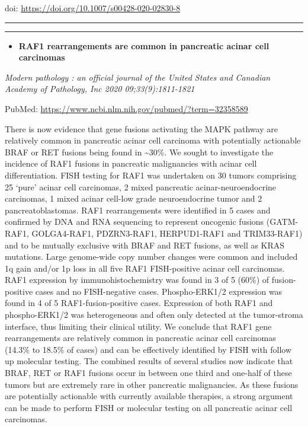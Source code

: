 \documentclass[
]{article}
\providecommand{\tightlist}{%
  \setlength{\itemsep}{0pt}\setlength{\parskip}{0pt}}
\begin{document}
doi: \url{https://doi.org/10.1007/s00428-020-02830-8}

\begin{center}\rule{0.5\linewidth}{0.5pt}\end{center}

\begin{center}\rule{0.5\linewidth}{0.5pt}\end{center}

\begin{itemize}
\tightlist
\item
  \textbf{RAF1 rearrangements are common in pancreatic acinar cell
  carcinomas}
\end{itemize}

\emph{Modern pathology : an official journal of the United States and
Canadian Academy of Pathology, Inc 2020 09;33(9):1811-1821}

PubMed: \url{https://www.ncbi.nlm.nih.gov/pubmed/?term=32358589}

There is now evidence that gene fusions activating the MAPK pathway are
relatively common in pancreatic acinar cell carcinoma with potentially
actionable BRAF or RET fusions being found in \textasciitilde30\%. We
sought to investigate the incidence of RAF1 fusions in pancreatic
malignancies with acinar cell differentiation. FISH testing for RAF1 was
undertaken on 30 tumors comprising 25 `pure' acinar cell carcinomas, 2
mixed pancreatic acinar-neuroendocrine carcinomas, 1 mixed acinar
cell-low grade neuroendocrine tumor and 2 pancreatoblastomas. RAF1
rearrangements were identified in 5 cases and confirmed by DNA and RNA
sequencing to represent oncogenic fusions (GATM-RAF1, GOLGA4-RAF1,
PDZRN3-RAF1, HERPUD1-RAF1 and TRIM33-RAF1) and to be mutually exclusive
with BRAF and RET fusions, as well as KRAS mutations. Large genome-wide
copy number changes were common and included 1q gain and/or 1p loss in
all five RAF1 FISH-positive acinar cell carcinomas. RAF1 expression by
immunohistochemistry was found in 3 of 5 (60\%) of fusion-positive cases
and no FISH-negative cases. Phospho-ERK1/2 expression was found in 4 of
5 RAF1-fusion-positive cases. Expression of both RAF1 and phospho-ERK1/2
was heterogeneous and often only detected at the tumor-stroma interface,
thus limiting their clinical utility. We conclude that RAF1 gene
rearrangements are relatively common in pancreatic acinar cell
carcinomas (14.3\% to 18.5\% of cases) and can be effectively identified
by FISH with follow up molecular testing. The combined results of
several studies now indicate that BRAF, RET or RAF1 fusions occur in
between one third and one-half of these tumors but are extremely rare in
other pancreatic malignancies. As these fusions are potentially
actionable with currently available therapies, a strong argument can be
made to perform FISH or molecular testing on all pancreatic acinar cell
carcinomas.
\end{document}
